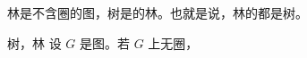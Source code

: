 
林是不含圈的图，树是的林。也就是说，林的都是树。

\begin{definition}{树，林}
设 $G$ 是图。若 $G$ 上无圈，
\end{definition}























